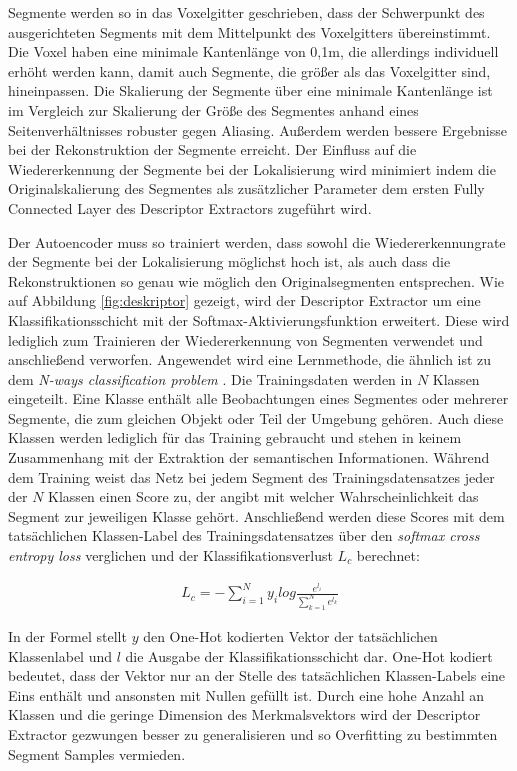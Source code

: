 Segmente werden so in das Voxelgitter geschrieben, dass der Schwerpunkt des ausgerichteten Segments mit dem Mittelpunkt des Voxelgitters übereinstimmt. Die Voxel haben eine minimale Kantenlänge von 0,1m, die allerdings individuell erhöht werden kann, damit auch Segmente, die größer als das Voxelgitter sind, hineinpassen. Die Skalierung der Segmente über eine minimale Kantenlänge ist im Vergleich zur Skalierung der Größe des Segmentes anhand eines Seitenverhältnisses robuster gegen Aliasing. Außerdem werden bessere Ergebnisse bei der Rekonstruktion der Segmente erreicht. Der Einfluss auf die Wiedererkennung der Segmente bei der Lokalisierung wird minimiert indem die Originalskalierung des Segmentes als zusätzlicher Parameter dem ersten Fully Connected Layer des Descriptor Extractors zugeführt wird. 

Der Autoencoder muss so trainiert werden, dass sowohl die Wiedererkennungrate der Segmente bei der Lokalisierung möglichst hoch ist, als auch dass die Rekonstruktionen so genau wie möglich den Originalsegmenten entsprechen. Wie auf Abbildung \ref{fig:deskriptor} gezeigt, wird der Descriptor Extractor um eine Klassifikationsschicht mit der Softmax-Aktivierungsfunktion erweitert. Diese wird lediglich zum Trainieren der Wiedererkennung von Segmenten verwendet und anschließend verworfen. Angewendet wird eine Lernmethode, die ähnlich ist zu dem \textit{N-ways classification problem} \cite{Parkhi2015}. Die Trainingsdaten werden in $ N $ Klassen eingeteilt. Eine Klasse enthält alle Beobachtungen eines Segmentes oder mehrerer Segmente, die zum gleichen Objekt oder Teil der Umgebung gehören. Auch diese Klassen werden lediglich für das Training gebraucht und stehen in keinem Zusammenhang mit der Extraktion der semantischen Informationen. Während dem Training weist das Netz bei jedem Segment des Trainingsdatensatzes jeder der $ N $ Klassen einen Score zu, der angibt mit welcher Wahrscheinlichkeit das Segment zur jeweiligen Klasse gehört. Anschließend werden diese Scores  mit dem tatsächlichen Klassen-Label des Trainingsdatensatzes über den \textit{softmax cross entropy loss} verglichen und der Klassifikationsverlust  $ L_c $ berechnet:

\begin{align}
	L_c = -\sum_{i=1}^{N} y_i log\frac{e^{l_i}}{\sum_{k=1}^{N} e^{l_k}}
\end{align}

In der Formel stellt $ y $ den One-Hot kodierten Vektor der tatsächlichen Klassenlabel und $ l $ die Ausgabe der Klassifikationsschicht dar. One-Hot kodiert bedeutet, dass der Vektor nur an der Stelle des tatsächlichen Klassen-Labels eine Eins enthält und ansonsten mit Nullen gefüllt ist. Durch eine hohe Anzahl an Klassen und die geringe Dimension des Merkmalsvektors wird der Descriptor Extractor gezwungen besser zu generalisieren und so Overfitting zu bestimmten Segment Samples vermieden.


